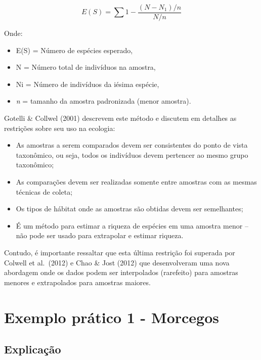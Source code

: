 \documentclass[
]{book}
\providecommand{\tightlist}{%
  \setlength{\itemsep}{0pt}\setlength{\parskip}{0pt}}
\begin{document}
\[E(S) = \sum 1 - \frac{{(N - N_1)}/{n}}{{N}/{n}}\]

Onde:

\begin{itemize}
\item
  E(S) = Número de espécies esperado,
\item
  N = Número total de indivíduos na amostra,
\item
  Ni = Número de indivíduos da iésima espécie,
\item
  \emph{n} = tamanho da amostra padronizada (menor amostra).
\end{itemize}

Gotelli \& Collwel (2001) descrevem este método e discutem em detalhes as restrições sobre seu uso na ecologia:

\begin{itemize}
\tightlist
\item
  As amostras a serem comparados devem ser consistentes do ponto de vista taxonômico, ou seja, todos os indivíduos devem pertencer ao mesmo grupo taxonômico;\\
\item
  As comparações devem ser realizadas somente entre amostras com as mesmas técnicas de coleta;\\
\item
  Os tipos de hábitat onde as amostras são obtidas devem ser semelhantes;\\
\item
  É um método para estimar a riqueza de espécies em uma amostra menor -- não pode ser usado para extrapolar e estimar riqueza.
\end{itemize}

Contudo, é importante ressaltar que esta última restrição foi superada por Colwell et al.~(2012) e Chao \& Jost (2012) que desenvolveram uma nova abordagem onde os dados podem ser interpolados (rarefeito) para amostras menores e extrapolados para amostras maiores.

\hypertarget{exemplo-pruxe1tico-1---morcegos}{%
\section{Exemplo prático 1 - Morcegos}\label{exemplo-pruxe1tico-1---morcegos}}

\hypertarget{explicauxe7uxe3o}{%
\subsection{Explicação}\label{explicauxe7uxe3o}}
\end{document}
